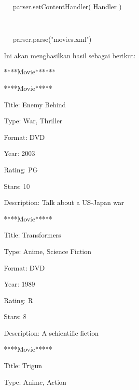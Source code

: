 \noindent 
~~ parser.setContentHandler( Handler ) \par
\noindent 
~~  \par
\noindent 
~~ parser.parse("movies.xml") \par
\vspace{12pt}
\vspace{12pt}
\noindent 
Ini akan menghasilkan hasil sebagai berikut: \par
\noindent 
{\fontsize{10pt}{10pt}\selectfont *****Movie******} \par
\noindent 
{\fontsize{10pt}{10pt}\selectfont *****Movie*****} \par
\noindent 
{\fontsize{10pt}{10pt}\selectfont Title: Enemy Behind} \par
\noindent 
{\fontsize{10pt}{10pt}\selectfont Type: War, Thriller} \par
\noindent 
{\fontsize{10pt}{10pt}\selectfont Format: DVD} \par
\noindent 
{\fontsize{10pt}{10pt}\selectfont Year: 2003} \par
\noindent 
{\fontsize{10pt}{10pt}\selectfont Rating: PG} \par
\noindent 
{\fontsize{10pt}{10pt}\selectfont Stars: 10} \par
\noindent 
{\fontsize{10pt}{10pt}\selectfont Description: Talk about a US-Japan war} \par
\noindent 
{\fontsize{10pt}{10pt}\selectfont *****Movie*****} \par
\noindent 
{\fontsize{10pt}{10pt}\selectfont Title: Transformers} \par
\noindent 
{\fontsize{10pt}{10pt}\selectfont Type: Anime, Science Fiction} \par
\noindent 
{\fontsize{10pt}{10pt}\selectfont Format: DVD} \par
\noindent 
{\fontsize{10pt}{10pt}\selectfont Year: 1989} \par
\noindent 
{\fontsize{10pt}{10pt}\selectfont Rating: R} \par
\noindent 
{\fontsize{10pt}{10pt}\selectfont Stars: 8} \par
\noindent 
{\fontsize{10pt}{10pt}\selectfont Description: A schientific fiction} \par
\noindent 
{\fontsize{10pt}{10pt}\selectfont *****Movie*****} \par
\noindent 
{\fontsize{10pt}{10pt}\selectfont Title: Trigun} \par
\noindent 
{\fontsize{10pt}{10pt}\selectfont Type: Anime, Action} \par
